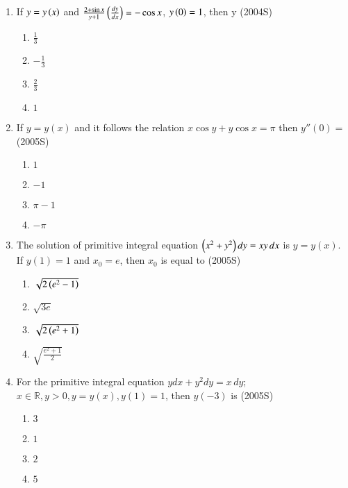 \documentclass[journal,12pt,twocolumn]{IEEEtran}
\theoremstyle{remark}
\begin{document}
\begin{enumerate}
\item If $y = y\left(x\right)$ and $\frac{2 + \sin x}{y + 1}\left(\frac{dy}{dx}\right) = -\cos x$, $y\left(0\right) = 1$, then y \hfill (2004S)

\begin{multicols}{2}
\begin{enumerate}
    \item $\frac{1}{3}$
    \item $-\frac{1}{3}$
    \item $\frac{2}{3}$
    \item $1$
\end{enumerate}
\end{multicols}

\item If $y = y(x)$ and it follows the relation $x \cos y + y \cos x = \pi$ then $y''(0) =$ \hfill (2005S)

\begin{multicols}{2}
\begin{enumerate}
    \item $1$
    \item $-1$
    \item $\pi - 1$
    \item $-\pi$
\end{enumerate}  
\end{multicols}

\item The solution of primitive integral equation $\left(x^2 + y^2\right)dy = xy \, dx$ is $y = y(x)$. If $y(1) = 1$ and $x_0 = e$, then $x_0$ is equal to \hfill (2005S)

\begin{multicols}{2}
\begin{enumerate}
    \item $\sqrt{2\left(e^2 - 1\right)}$
    \item $\sqrt{3e}$ 
    \item $\sqrt{2\left(e^2 + 1\right)}$
    \item $\sqrt{\frac{e^2 + 1}{2}}$
\end{enumerate}
\end{multicols}

\item For the primitive integral equation $y dx + y^2 dy = x \, dy$; $x \in \mathbb{R}, y > 0, y = y(x), y(1) = 1$, then $y(-3)$ is \hfill (2005S)

\begin{multicols}{2}
\begin{enumerate}
    \item $3$
    \item $1$ 
    \item $2$
    \item $5$
\end{enumerate}
\end{multicols}


\end{enumerate}
\end{document}
